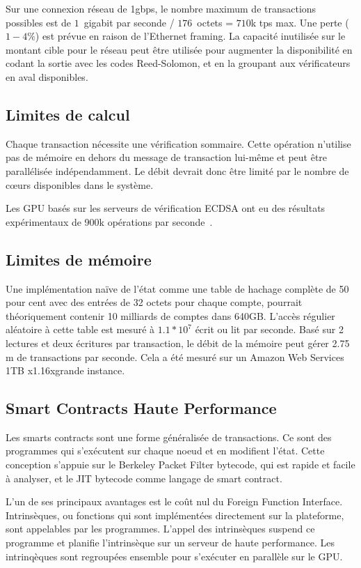 \documentclass[12pt]{article}
\begin{document}
Sur une connexion réseau de 1gbps, le nombre maximum de transactions possibles est de $1$~gigabit par seconde / $176$~octets = $710$k tps max. Une perte ($1-4\%$) est prévue en raison de l’Ethernet framing. La capacité inutilisée sur le montant cible pour le réseau peut être utilisée pour augmenter la disponibilité en codant la sortie avec les codes Reed-Solomon, et en la groupant aux vérificateurs en aval disponibles.
\subsection{Limites de calcul}
Chaque transaction nécessite une vérification sommaire. Cette opération n'utilise pas de mémoire en dehors du message de transaction lui-même et peut être parallélisée indépendamment. Le débit devrait donc être limité par le nombre de cœurs disponibles dans le système.

Les GPU basés sur les serveurs de vérification ECDSA ont eu des résultats expérimentaux de 900k opérations par seconde~\cite{gpuecc}.
\subsection{Limites de mémoire}
Une implémentation naïve de l'état comme une table de hachage complète de 50 pour cent avec des entrées de 32 octets pour chaque compte, pourrait théoriquement contenir 10 milliards de comptes dans 640GB. L'accès régulier aléatoire à cette table est mesuré à \(1.1 * 10^7\) écrit ou lit par seconde. Basé sur 2 lectures et deux écritures par transaction, le débit de la mémoire peut gérer 2.75 m de transactions par seconde. Cela a été mesuré sur un Amazon Web Services 1TB x1.16xgrande instance.

\subsection{Smart Contracts Haute Performance}\label{sec:smartcontracts}

Les smarts contracts sont une forme généralisée de transactions. Ce sont des programmes qui s'exécutent sur chaque noeud et en modifient l'état. Cette conception s'appuie sur le Berkeley Packet Filter bytecode, qui est rapide et facile à analyser, et le JIT bytecode comme langage de smart contract.

L'un de ses principaux avantages est le coût nul du Foreign Function Interface. Intrinsèques, ou  fonctions qui sont implémentées directement sur la plateforme, sont appelables par  les programmes. L'appel des intrinsèques suspend ce programme et planifie l'intrinsèque sur un serveur de haute performance. Les intrinqèques sont regroupées ensemble pour s'exécuter en parallèle sur le GPU.
\end{document}
